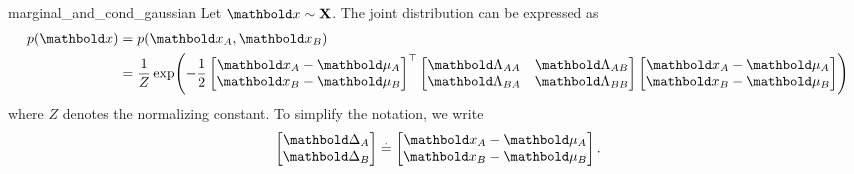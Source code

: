 \begin{solution}{marginal_and_cond_gaussian}
  Let $\vx \sim \rX$.
  The joint distribution can be expressed as \begin{align*}
    p(\vx) &= p(\vx_A, \vx_B) \\
    &= \frac{1}{Z} \exp\parentheses*{-\frac{1}{2} \transpose{\begin{bmatrix}
      \vx_A - \vmu_A \\
      \vx_B - \vmu_B
    \end{bmatrix}} \begin{bmatrix}
      \mLambda_{AA} & \mLambda_{AB} \\
      \mLambda_{BA} & \mLambda_{BB}
    \end{bmatrix} \begin{bmatrix}
      \vx_A - \vmu_A \\
      \vx_B - \vmu_B
    \end{bmatrix}}
  \end{align*} where $Z$ denotes the normalizing constant.
  To simplify the notation, we write \begin{align*}
    \begin{bmatrix}
      \vDelta_A \\
      \vDelta_B
    \end{bmatrix} \defeq \begin{bmatrix}
      \vx_A - \vmu_A \\
      \vx_B - \vmu_B
    \end{bmatrix}.
  \end{align*}


\end{solution}
